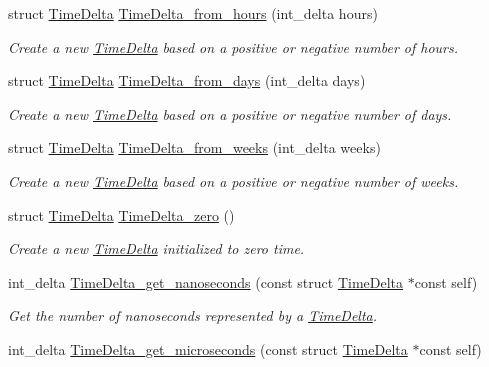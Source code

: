 \begin{DoxyCompactItemize}
struct \hyperlink{structTimeDelta}{\-Time\-Delta} \hyperlink{time-delta_8h_a56f1c443994cd0cbe306cd04e378eabe}{\-Time\-Delta\-\_\-from\-\_\-hours} (int\-\_\-delta hours)
\begin{DoxyCompactList}\small\item\em \-Create a new \hyperlink{structTimeDelta}{\-Time\-Delta} based on a positive or negative number of hours. \end{DoxyCompactList}\item 
struct \hyperlink{structTimeDelta}{\-Time\-Delta} \hyperlink{time-delta_8h_a63cc9a37b13e1ea2c9517a15254761dd}{\-Time\-Delta\-\_\-from\-\_\-days} (int\-\_\-delta days)
\begin{DoxyCompactList}\small\item\em \-Create a new \hyperlink{structTimeDelta}{\-Time\-Delta} based on a positive or negative number of days. \end{DoxyCompactList}\item 
struct \hyperlink{structTimeDelta}{\-Time\-Delta} \hyperlink{time-delta_8h_adeaef2754da892c29f03834c14ad1204}{\-Time\-Delta\-\_\-from\-\_\-weeks} (int\-\_\-delta weeks)
\begin{DoxyCompactList}\small\item\em \-Create a new \hyperlink{structTimeDelta}{\-Time\-Delta} based on a positive or negative number of weeks. \end{DoxyCompactList}\item 
struct \hyperlink{structTimeDelta}{\-Time\-Delta} \hyperlink{time-delta_8h_a4d78cdef19464e2c645923c831f38910}{\-Time\-Delta\-\_\-zero} ()
\begin{DoxyCompactList}\small\item\em \-Create a new \hyperlink{structTimeDelta}{\-Time\-Delta} initialized to zero time. \end{DoxyCompactList}\item 
int\-\_\-delta \hyperlink{time-delta_8h_a1c5687bfcf6d342dd152e1085e53c777}{\-Time\-Delta\-\_\-get\-\_\-nanoseconds} (const struct \hyperlink{structTimeDelta}{\-Time\-Delta} $\ast$const self)
\begin{DoxyCompactList}\small\item\em \-Get the number of nanoseconds represented by a \hyperlink{structTimeDelta}{\-Time\-Delta}. \end{DoxyCompactList}\item 
int\-\_\-delta \hyperlink{time-delta_8h_abb6e5f84d388603a3435795055628238}{\-Time\-Delta\-\_\-get\-\_\-microseconds} (const struct \hyperlink{structTimeDelta}{\-Time\-Delta} $\ast$const self)

\end{DoxyCompactItemize}
